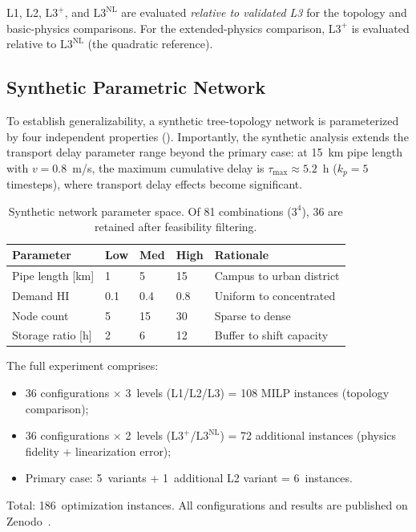 \documentclass[review,3p]{elsarticle}
\newcommand{\Lplus}{\mathrm{L3}^{+}}
\newcommand{\Lnl}{\mathrm{L3}^{\mathrm{NL}}}
\begin{document}
L1, L2, $\Lplus$, and $\Lnl$ are evaluated \emph{relative to
validated L3} for the topology and basic-physics comparisons. For
the extended-physics comparison, $\Lplus$ is evaluated relative to
$\Lnl$ (the quadratic reference).

\subsection{Synthetic Parametric Network}
\label{sec:case_synthetic}

To establish generalizability, a synthetic tree-topology network is
parameterized by four independent properties ().
Importantly, the synthetic analysis extends the transport delay
parameter range beyond the primary case: at 15~km pipe length with
$v = 0.8$~m/s, the maximum cumulative delay is
$\tau_{\max} \approx 5.2$~h ($k_p = 5$ timesteps), where transport
delay effects become significant.

\begin{table}[htbp]
\centering
\caption{Synthetic network parameter space. Of 81 combinations
($3^4$), 36 are retained after feasibility filtering.}
\label{tab:synthetic}
\begin{tabular}{@{}llllp{3.8cm}@{}}
\toprule
Parameter & Low & Med & High & Rationale \\
\midrule
Pipe length [km]  & 1  & 5  & 15
  & Campus to urban district \\
Demand HI          & 0.1 & 0.4 & 0.8
  & Uniform to concentrated \\
Node count         & 5  & 15 & 30
  & Sparse to dense \\
Storage ratio [h]  & 2  & 6  & 12
  & Buffer to shift capacity \\
\bottomrule
\end{tabular}
\end{table}

The full experiment comprises:
\begin{itemize}[nosep]
    \item 36 configurations $\times$ 3~levels (L1/L2/L3) = 108
    MILP instances (topology comparison);
    \item 36 configurations $\times$ 2~levels ($\Lplus$/$\Lnl$) =
    72 additional instances (physics fidelity + linearization error);
    \item Primary case: 5~variants + 1~additional L2 variant =
    6~instances.
\end{itemize}
Total: 186~optimization instances. All configurations and results
are published on Zenodo~\cite{Zenodo_data}.
\end{document}
